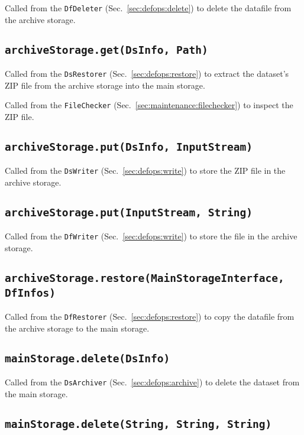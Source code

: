 \documentclass[paper=a4]{scrartcl}
\begin{document}
Called from the \texttt{DfDeleter} (Sec.~\ref{sec:defops:delete}) to
delete the datafile from the archive storage.

\subsection{\texttt{archiveStorage.get(DsInfo, Path)}}

Called from the \texttt{DsRestorer} (Sec.~\ref{sec:defops:restore})
to extract the dataset's ZIP file from the archive storage into the
main storage.

Called from the \texttt{FileChecker}
(Sec.~\ref{sec:maintenance:filechecker}) to inspect the ZIP file.

\subsection{\texttt{archiveStorage.put(DsInfo, InputStream)}}

Called from the \texttt{DsWriter} (Sec.~\ref{sec:defops:write}) to
store the ZIP file in the archive storage.

\subsection{\texttt{archiveStorage.put(InputStream, String)}}

Called from the \texttt{DfWriter} (Sec.~\ref{sec:defops:write}) to
store the file in the archive storage.

\subsection{\texttt{archiveStorage.restore(MainStorageInterface, DfInfos)}}

Called from the \texttt{DfRestorer} (Sec.~\ref{sec:defops:restore})
to copy the datafile from the archive storage to the main storage.

\subsection{\texttt{mainStorage.delete(DsInfo)}}

Called from the \texttt{DsArchiver} (Sec.~\ref{sec:defops:archive})
to delete the dataset from the main storage.

\subsection{\texttt{mainStorage.delete(String, String, String)}}
\end{document}
